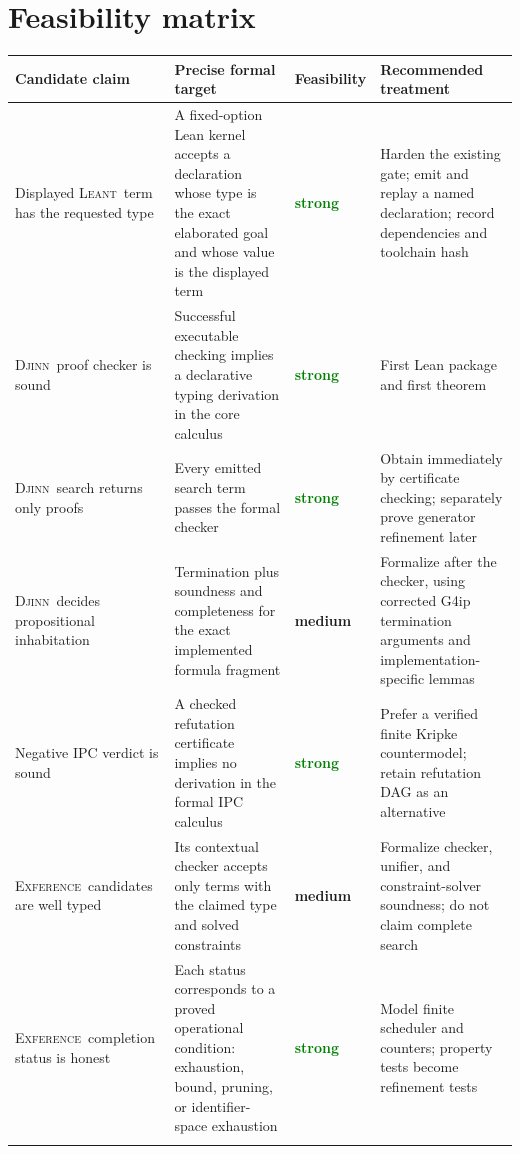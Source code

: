 \documentclass[11pt,letterpaper,openany]{report}
\theoremstyle{definition}
\theoremstyle{remark}
\newcommand{\Djinn}{\textsc{Djinn}}
\newcommand{\Exference}{\textsc{Exference}}
\newcommand{\Leant}{\textsc{Leant}}
\newcommand{\strong}{\textcolor{Green}{\textbf{strong}}}
\newcommand{\medium}{\textcolor{Amber}{\textbf{medium}}}
\begin{document}
\section{Feasibility matrix}

\begin{table}[htbp]
\centering
\small
\begin{tabularx}{\textwidth}{L{0.22\textwidth} L{0.31\textwidth} L{0.12\textwidth} Y}
\toprule
\textbf{Candidate claim} & \textbf{Precise formal target} & \textbf{Feasibility} & \textbf{Recommended treatment} \\
\midrule
Displayed \Leant\ term has the requested type & A fixed-option Lean kernel accepts a declaration whose type is the exact elaborated goal and whose value is the displayed term & \strong & Harden the existing gate; emit and replay a named declaration; record dependencies and toolchain hash \\
\addlinespace
\Djinn\ proof checker is sound & Successful executable checking implies a declarative typing derivation in the core calculus & \strong & First Lean package and first theorem \\
\addlinespace
\Djinn\ search returns only proofs & Every emitted search term passes the formal checker & \strong & Obtain immediately by certificate checking; separately prove generator refinement later \\
\addlinespace
\Djinn\ decides propositional inhabitation & Termination plus soundness and completeness for the exact implemented formula fragment & \medium & Formalize after the checker, using corrected G4ip termination arguments and implementation-specific lemmas \\
\addlinespace
Negative IPC verdict is sound & A checked refutation certificate implies no derivation in the formal IPC calculus & \strong & Prefer a verified finite Kripke countermodel; retain refutation DAG as an alternative \\
\addlinespace
\Exference\ candidates are well typed & Its contextual checker accepts only terms with the claimed type and solved constraints & \medium & Formalize checker, unifier, and constraint-solver soundness; do not claim complete search \\
\addlinespace
\Exference\ completion status is honest & Each status corresponds to a proved operational condition: exhaustion, bound, pruning, or identifier-space exhaustion & \strong & Model finite scheduler and counters; property tests become refinement tests \\
\addlinespace

\end{tabularx}
\end{table}
\end{document}
